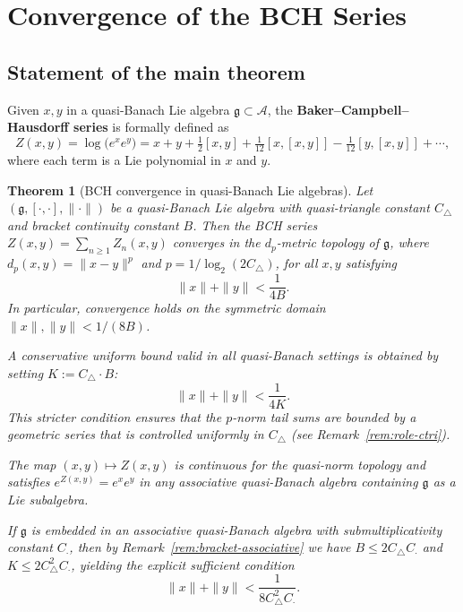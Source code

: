 \documentclass[10pt]{amsart}
\newtheorem{theorem}{Theorem}[section]
\theoremstyle{definition}
\theoremstyle{remark}
\numberwithin{equation}{section}
\newcommand{\Ctri}{C_{\triangle}}    %
\newcommand{\Cmult}{C_{\cdot}}       %
\newcommand{\Cbracket}{B}            %
\newcommand{\Ctotal}{K}              %
\begin{document}
\section{Convergence of the BCH Series}\label{sec:convergence}

\subsection{Statement of the main theorem}

Given $x,y$ in a quasi-Banach Lie algebra $\mathfrak{g}\subset\mathcal{A}$, the
\textbf{Baker--Campbell--Hausdorff series} is formally defined as
\[
  Z(x,y) = \log\bigl(e^x e^y\bigr)
          = x + y + \tfrac{1}{2}[x,y]
            + \tfrac{1}{12}[x,[x,y]] - \tfrac{1}{12}[y,[x,y]] + \cdots,
\]
where each term is a Lie polynomial in $x$ and $y$.

\begin{theorem}[BCH convergence in quasi-Banach Lie algebras]\label{thm:BCH}
Let $(\mathfrak{g},[\cdot,\cdot],\|\cdot\|)$ be a quasi-Banach Lie algebra with
quasi-triangle constant $\Ctri$ and bracket continuity constant $\Cbracket$.  Then the
BCH series $Z(x,y) = \sum_{n\ge 1} Z_n(x,y)$ converges in the $d_p$-metric topology of
$\mathfrak{g}$, where $d_p(x,y) = \|x-y\|^p$ and $p = 1/\log_2(2\Ctri)$, for all $x,y$
satisfying
\begin{equation}\label{eq:BCH-radius}
  \|x\| + \|y\| < \frac{1}{4\Cbracket}.
\end{equation}
In particular, convergence holds on the symmetric domain $\|x\|,\|y\| < 1/(8\Cbracket)$.

A conservative uniform bound valid in all quasi-Banach settings is obtained by setting
$\Ctotal := \Ctri \cdot \Cbracket$:
\[
  \|x\| + \|y\| < \frac{1}{4\Ctotal}.
\]
This stricter condition ensures that the $p$-norm tail sums are bounded by a geometric
series that is controlled uniformly in $\Ctri$ (see Remark~\ref{rem:role-ctri}).

The map $(x,y)\mapsto Z(x,y)$ is continuous for the quasi-norm topology and satisfies
$e^{Z(x,y)} = e^x e^y$ in any associative quasi-Banach algebra containing $\mathfrak{g}$
as a Lie subalgebra.

If $\mathfrak{g}$ is embedded in an associative quasi-Banach algebra with
submultiplicativity constant $\Cmult$, then by Remark~\ref{rem:bracket-associative} we
have $\Cbracket \leq 2\Ctri\Cmult$ and $\Ctotal \leq 2\Ctri^2\Cmult$, yielding the
explicit sufficient condition
\[
  \|x\| + \|y\| < \frac{1}{8\Ctri^2\Cmult}.
\]
\end{theorem}
\end{document}
